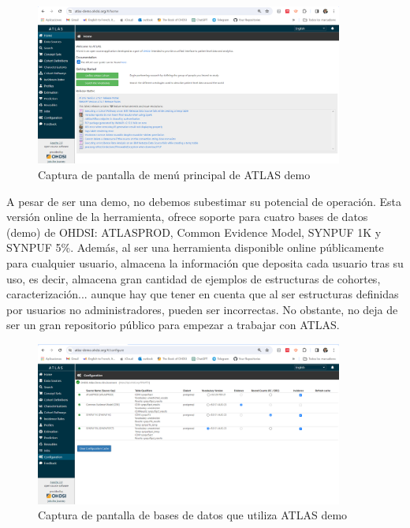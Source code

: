 \documentclass{article}
\begin{document}
\begin{figure}[H]
    \centering
    \includegraphics[width=0.90\textwidth]{images/atlasDemo.png}
    \caption{Captura de pantalla de menú principal de ATLAS demo}
\end{figure}

A pesar de ser una demo, no debemos subestimar su potencial de operación. Esta versión online de la herramienta, ofrece soporte para cuatro bases de datos (demo) de OHDSI: ATLASPROD, Common Evidence Model, SYNPUF 1K y SYNPUF 5\%. Además, al ser una herramienta disponible online públicamente para cualquier usuario, almacena la información que deposita cada usuario tras su uso, es decir, almacena gran cantidad de ejemplos de estructuras de cohortes, caracterización... aunque hay que tener en cuenta que al ser estructuras definidas por usuarios no administradores, pueden ser incorrectas. No obstante, no deja de ser un gran repositorio público para empezar a trabajar con ATLAS. \\

\begin{figure}[H]
    \centering
    \includegraphics[width=0.90\textwidth]{images/atlasDemo(1).png}
    \caption{Captura de pantalla de bases de datos que utiliza ATLAS demo}
\end{figure}
\end{document}
